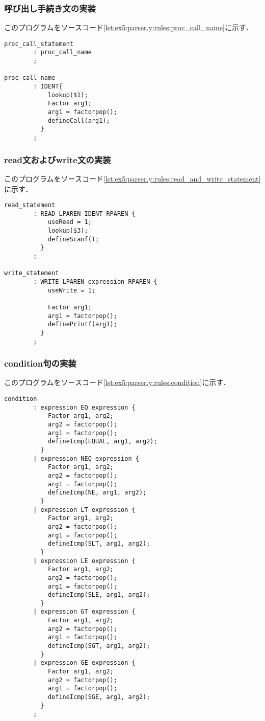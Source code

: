 \documentclass[uplatex]{jsarticle}
\begin{document}
\subsubsection{呼び出し手続き文の実装}
このプログラムをソースコード\ref{lst:ex5:parser.y:rules:proc_call_name}に示す．
\begin{lstlisting}[caption=手続き呼び出しの処理,label=lst:ex5:parser.y:rules:proc_call_name]
proc_call_statement
        : proc_call_name
        ;

proc_call_name
        : IDENT{
            lookup($1);
            Factor arg1;
            arg1 = factorpop();
            defineCall(arg1);
          }
        ;
\end{lstlisting}
\subsubsection{read文およびwrite文の実装}
このプログラムをソースコード\ref{lst:ex5:parser.y:rules:read_and_write_statement}に示す．
\begin{lstlisting}[caption=read文およびwrite文の処理,label=lst:ex5:parser.y:rules:read_and_write_statement]
read_statement
        : READ LPAREN IDENT RPAREN {
            useRead = 1;
            lookup($3);
            defineScanf();
          }
        ;

write_statement
        : WRITE LPAREN expression RPAREN {
            useWrite = 1;

            Factor arg1;
            arg1 = factorpop();
            definePrintf(arg1);
          }
        ;
\end{lstlisting}
\subsubsection{condition句の実装}
このプログラムをソースコード\ref{lst:ex5:parser.y:rules:condition}に示す．
\begin{lstlisting}[caption=condition句の処理,label=lst:ex5:parser.y:rules:condition]
condition
        : expression EQ expression {
            Factor arg1, arg2;
            arg2 = factorpop();
            arg1 = factorpop();
            defineIcmp(EQUAL, arg1, arg2);
          }
        | expression NEQ expression {
            Factor arg1, arg2;
            arg2 = factorpop();
            arg1 = factorpop();
            defineIcmp(NE, arg1, arg2);
          }
        | expression LT expression {
            Factor arg1, arg2;
            arg2 = factorpop();
            arg1 = factorpop();
            defineIcmp(SLT, arg1, arg2);
          }
        | expression LE expression {
            Factor arg1, arg2;
            arg2 = factorpop();
            arg1 = factorpop();
            defineIcmp(SLE, arg1, arg2);
          }
        | expression GT expression {
            Factor arg1, arg2;
            arg2 = factorpop();
            arg1 = factorpop();
            defineIcmp(SGT, arg1, arg2);
          }
        | expression GE expression {
            Factor arg1, arg2;
            arg2 = factorpop();
            arg1 = factorpop();
            defineIcmp(SGE, arg1, arg2);
          }
        ;
\end{lstlisting}
\end{document}
